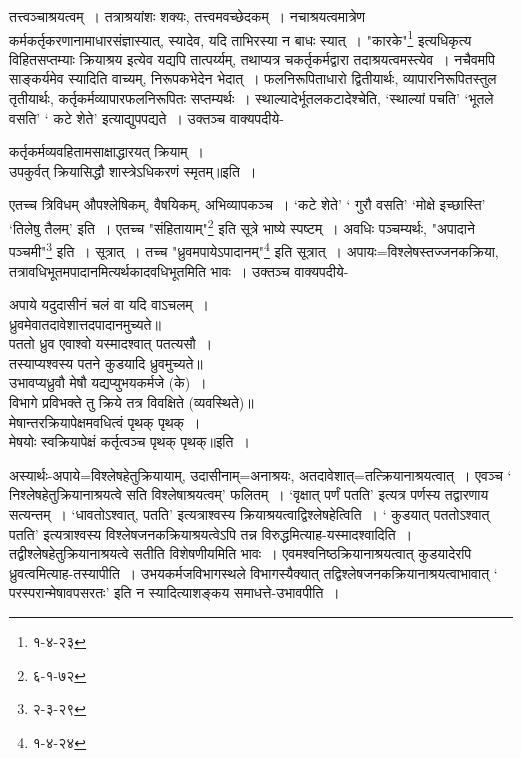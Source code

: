 {{{{तत्त्वञ्चाश्रयत्वम्~।
तत्राश्रयांशः शक्यः, तत्त्वमवच्छेदकम्~।
नचाश्रयत्वमात्रेण कर्मकर्तृकरणानामाधारसंज्ञास्यात्, स्यादेव, यदि ताभिरस्या न बाधः स्यात्~।
"कारके"\footnote{१-४-२३} इत्यधिकृत्य विहितसप्तम्याः क्रियाश्रय इत्येव यद्यपि तात्पर्य्यम्, तथाप्यत्र चकर्तृकर्मद्वारा तदाश्रयत्वमस्त्येव~।
{नचैवमपि साङ्कर्यमेव स्यादिति वाच्यम्, निरूपकभेदेन भेदात्~।
फलनिरूपिताधारो द्वितीयार्थः, व्यापारनिरूपितस्तुल तृतीयार्थः, कर्तृकर्मव्यापारफलनिरूपितः सप्तम्यर्थः}~।
स्थाल्यादेर्भूतलकटादेश्चेति, `स्थाल्यां पचति' `भूतले वसति' ` कटे शेते' इत्याद्युपपद्यते~।
उक्तञ्च वाक्यपदीये-
\begin{center} कर्तृकर्मव्यवहितामसाक्षाद्धारयत् क्रियाम्~।\\
 उपकुर्वत् क्रियासिद्धौ शास्त्रेऽधिकरणं स्मृतम्॥इति~।
\end{center}
एतच्च त्रिविधम् औपश्लेषिकम्, वैषयिकम्, अभिव्यापकञ्च~।
`कटे शेते' ` गुरौ वसति' `मोक्षे इच्छास्ति' `तिलेषु तैलम्' इति~।
एतच्च "संहितायाम्"\footnote{६-१-७२} इति सूत्रे भाष्ये स्पष्टम्~।
 अवधिः पञ्चम्यर्थः, "अपादाने पञ्चमी"\footnote{२-३-२९} {इति}~।
सूत्रात्~।
तच्च "ध्रुवमपायेऽपादानम्"\footnote{१-४-२४} इति सूत्रात्~।
अपायः=विश्लेषस्तज्जनकक्रिया, तत्रावधिभूतमपादानमित्यर्थकादवधिभूतमिति भावः~।
उक्तञ्च वाक्यपदीये-
\begin{center} अपाये यदुदासीनं चलं वा यदि वाऽचलम्~।\\
 ध्रुवमेवातदावेशात्तदपादानमुच्यते॥\\[10pt]
 पततो ध्रुव एवाश्वो यस्मादश्वात् पतत्यसौ~।\\
 तस्याप्यश्वस्य पतने कुडयादि ध्रुवमुच्यते॥\\[10pt]
 उभावप्यध्रुवौ मेषौ यद्यप्युभयकर्मजे (के)~।\\
 विभागे प्रविभक्ते तु क्रिये तत्र विवक्षिते (व्यवस्थिते)॥\\[10pt]
 मेषान्तरक्रियापेक्षमवधित्वं पृथक् पृथक्~।\\
 मेषयोः स्वक्रियापेक्षं कर्तृत्वञ्च पृथक् पृथक्॥इति~।
\end{center}
 अस्यार्थः-अपाये=विश्लेषहेतुक्रियायाम्, उदासीनाम्=अनाश्रयः, अतदावेशात्=तत्क्रियानाश्रयत्वात्~।
एवञ्च ` निश्लेषहेतुक्रियानाश्रयत्वे सति विश्लेषाश्रयत्वम्' फलितम्~।
`वृक्षात् पर्णं पतति' इत्यत्र पर्णस्य तद्वारणाय सत्यन्तम्~।
 `धावतोऽश्वात्, पतति' इत्यत्राश्वस्य क्रियाश्रयत्वाद्विश्लेषहेत्विति~।
` कुडयात् पततोऽश्वात् पतति' इत्यत्राश्वस्य विश्लेषजनकक्रियाश्रयत्वेऽपि तन्न विरुद्धमित्याह-यस्मादश्वादिति~।
तद्वीश्लेषहेतुक्रियानाश्रयत्वे सतीति विशेषणीयमिति भावः~।
एवमश्वनिष्ठक्रियानाश्रयत्वात् कुडयादेरपि ध्रुवत्वमित्याह-तस्यापीति~।
 उभयकर्मजविभागस्थले विभागस्यैक्यात् तद्विश्लेषजनकक्रियानाश्रयत्वाभावात् ` परस्परान्मेषावपसरतः' इति न स्यादित्याशङ्कय समाधत्ते-उभावपीति~।
}}}}
